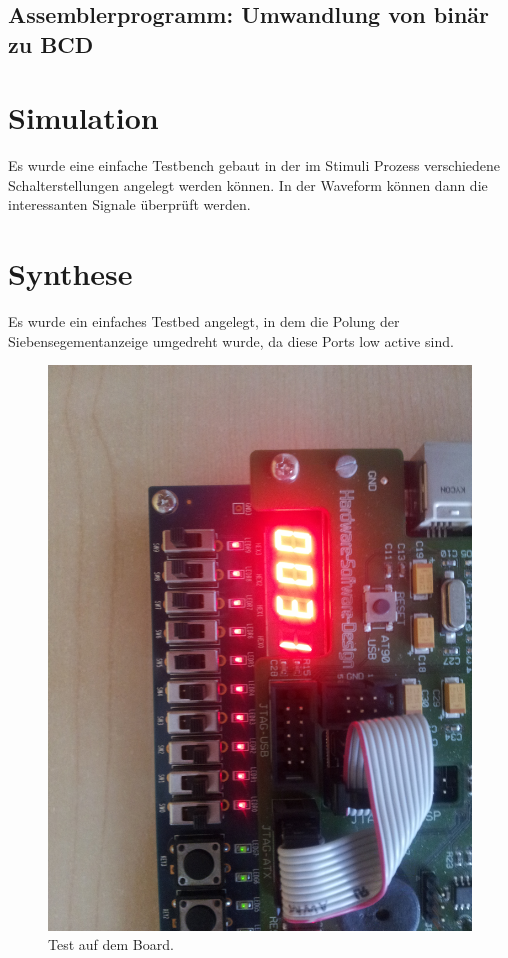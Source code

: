 \documentclass[12pt,a4paper]{article}
\begin{document}
\subsection{Assemblerprogramm: Umwandlung von binär zu BCD}


\section{Simulation}
Es wurde eine einfache Testbench gebaut in der im Stimuli Prozess verschiedene Schalterstellungen angelegt werden können. In der Waveform können dann die interessanten Signale überprüft werden.

\section{Synthese}
Es wurde ein einfaches Testbed angelegt, in dem die Polung der Siebensegementanzeige umgedreht wurde, da diese Ports low active sind.

\begin{figure}[ht]
\centering
\includegraphics[width=\textwidth]{board}
\caption{Test auf dem Board.}
\end{figure}
\end{document}
